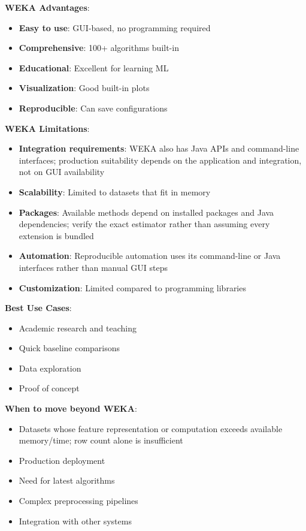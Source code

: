 \documentclass[11pt,twoside]{article}
\numberwithin{equation}{section}
\theoremstyle{plain}
\theoremstyle{definition}
\theoremstyle{remark}
\newenvironment{keyidea}{
  \begin{tcolorbox}[colback=yellow!5!white,
                    colframe=yellow!50!black,
                    title=Key Idea,
                    breakable,
                    enhanced,
                    sharp corners,
                    boxrule=0.8pt,
                    left=6pt, right=6pt, top=6pt, bottom=6pt]
}{
  \end{tcolorbox}
}
\begin{document}
\begin{keyidea}
\textbf{WEKA Advantages}:
\begin{itemize}
\item \textbf{Easy to use}: GUI-based, no programming required
\item \textbf{Comprehensive}: 100+ algorithms built-in
\item \textbf{Educational}: Excellent for learning ML
\item \textbf{Visualization}: Good built-in plots
\item \textbf{Reproducible}: Can save configurations
\end{itemize}

\textbf{WEKA Limitations}:
\begin{itemize}
\item \textbf{Integration requirements}: WEKA also has Java APIs and command-line interfaces; production suitability depends on the application and integration, not on GUI availability
\item \textbf{Scalability}: Limited to datasets that fit in memory
\item \textbf{Packages}: Available methods depend on installed packages and Java dependencies; verify the exact estimator rather than assuming every extension is bundled
\item \textbf{Automation}: Reproducible automation uses its command-line or Java interfaces rather than manual GUI steps
\item \textbf{Customization}: Limited compared to programming libraries
\end{itemize}

\textbf{Best Use Cases}:
\begin{itemize}
\item Academic research and teaching
\item Quick baseline comparisons
\item Data exploration
\item Proof of concept
\end{itemize}

\textbf{When to move beyond WEKA}:
\begin{itemize}
\item Datasets whose feature representation or computation exceeds available memory/time; row count alone is insufficient
\item Production deployment
\item Need for latest algorithms
\item Complex preprocessing pipelines
\item Integration with other systems
\end{itemize}
\end{keyidea}
\end{document}
